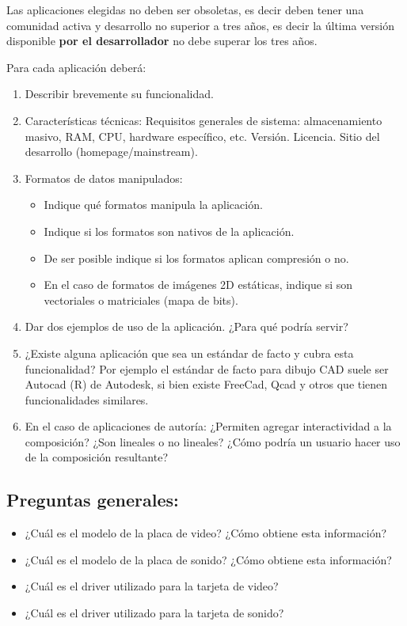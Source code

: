 \documentclass[12pt]{article}
\begin{document}
Las aplicaciones elegidas no deben ser obsoletas, es decir deben
tener una comunidad activa y desarrollo no superior a tres años, 
es decir la última versión disponible {\bf por el desarrollador}
no debe superar los tres años. 

Para cada aplicación deberá:
\begin{enumerate}
\item Describir brevemente su funcionalidad. 
\item Características técnicas: Requisitos generales 
de sistema: almacenamiento masivo, RAM, CPU, hardware específico, etc. 
Versión. Licencia. Sitio del desarrollo (homepage/mainstream). 
\item Formatos de datos manipulados: 
	\begin{itemize}
	\item Indique qué formatos manipula la aplicación.
	\item Indique si los formatos son nativos de la aplicación. 
	\item De ser posible indique si los formatos aplican compresión o no.
	\item En el caso de formatos de imágenes 2D estáticas, indique si son 
	vectoriales o matriciales (mapa de bits).
	\end{itemize} 
\item Dar dos ejemplos de uso de la aplicación. ¿Para qué podría servir? 
\item ¿Existe alguna aplicación que sea un estándar de facto y cubra esta
funcionalidad? Por ejemplo el estándar de facto para dibujo CAD suele ser
Autocad (R) de Autodesk, si bien existe FreeCad, Qcad y otros que tienen
funcionalidades similares. 
\item En el caso de aplicaciones de autoría: ¿Permiten agregar interactividad 
a la composición? ¿Son lineales o no lineales? ¿Cómo podría un usuario hacer
uso de la composición resultante?
\end{enumerate}

\subsection*{Preguntas generales:}
\begin{itemize}
\item ¿Cuál es el modelo de la placa de video? ¿Cómo obtiene esta información?
\item ¿Cuál es el modelo de la placa de sonido? ¿Cómo obtiene esta información?
\item ¿Cuál es el driver utilizado para la tarjeta de video?
\item ¿Cuál es el driver utilizado para la tarjeta de sonido?
\end{itemize}
\end{document}
